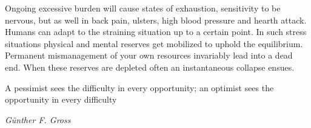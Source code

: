 \documentclass[../Book.Stress_regulation.tex]{subfiles}
\begin{document}
Ongoing excessive burden will cause states of exhaustion, sensitivity to be nervous, but as well in back pain, ulsters, high blood pressure and hearth attack. Humans can adapt to the straining situation up to a certain point. In such stress situations physical and mental reserves get mobilized to uphold the equilibrium. Permanent mismanagement of your own resources invariably lead into a dead end. When these reserves are depleted often an instantaneous collapse ensues.

\epigraph{A pessimist sees the difficulty in every opportunity; an optimist sees the opportunity in every difficulty}{\textit{G\"unther F. Gross}}
\end{document}
